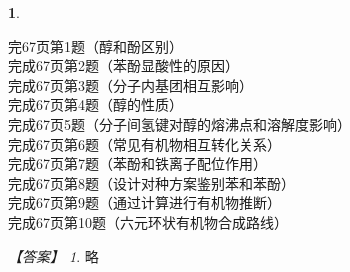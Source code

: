 \documentclass[UTF8, 10pt, a4paper, oneside]{ctexart}
\newcommand{\fs}[1]{{\fangsong #1}}%
\theoremstyle{definition}
\newtheorem{exercise}{}
\theoremstyle{remark}
\newtheorem*{answer}{【答案】}
\theoremstyle{plain}
\begin{document}
\begin{exercise}
        \begin{multicols}{2}
\noindent 完67页第1题（醇和酚区别）\\
完成67页第2题（苯酚显酸性的原因）\\
完成67页第3题（分子内基团相互影响）\\
完成67页第4题（醇的性质）\\
完成67页5题（分子间氢键对醇的熔沸点和溶解度影响）\\
完成67页第6题（常见有机物相互转化关系）\\
完成67页第7题（苯酚和铁离子配位作用）\\
完成67页第8题（设计对种方案鉴别苯和苯酚）\\
完成67页第9题（通过计算进行有机物推断）\\
完成67页第10题（六元环状有机物合成路线）
    \end{multicols}
    \begin{answer}
        \fs{略}
    \end{answer}
\end{exercise}
\end{document}
